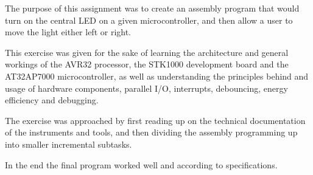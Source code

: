 The purpose of this assignment was to create an assembly program that would turn on the central LED on a given microcontroller, and then allow a user to move the light either left or right.

This exercise was given for the sake of learning the architecture and general workings of the AVR32 processor, the STK1000 development board and the AT32AP7000 microcontroller, as well as understanding the principles behind and usage of hardware components, parallel I/O, interrupts, debouncing, energy efficiency and debugging.

The exercise was approached by first reading up on the technical documentation of the instruments and tools, and then dividing the assembly programming up into smaller incremental subtasks.

In the end the final program worked well and according to specifications.
